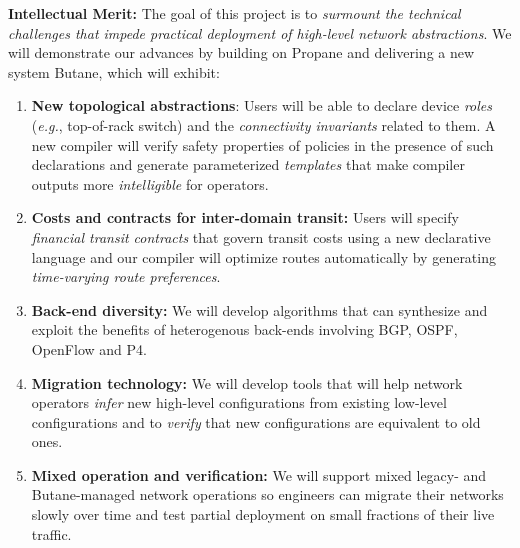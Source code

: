 \documentclass[12pt]{article}
\makeatletter
\newcommand{\Propane}{{\sc Propane}\@\xspace}
\newcommand{\Name}{{\sc Butane}\@\xspace}
\makeatother
\begin{document}
\noindent
\textbf{Intellectual Merit:} 
The goal of this project is to 
{\em surmount the technical challenges that impede practical 
deployment of high-level network abstractions}.  We will demonstrate
our advances by building on \Propane and delivering a new system \Name, which
will exhibit:  
\begin{enumerate}
\item {\bf New topological abstractions}:  Users will be able to declare device 
\emph{roles} (\emph{e.g.}, top-of-rack switch)
and the \emph{connectivity invariants} related to them.  A new compiler
will verify safety properties of policies in the presence of such 
declarations and generate parameterized \emph{templates}
that make compiler outputs more \emph{intelligible} for operators.  
\item {\bf Costs and contracts for inter-domain transit:}
Users will specify 
\emph{financial transit contracts} that govern transit
costs using a new declarative language and our compiler will
optimize routes automatically by generating  \emph{time-varying route preferences}.
\item {\bf Back-end diversity:}  We will develop algorithms that
can synthesize and exploit the benefits of heterogenous back-ends 
involving BGP, OSPF, OpenFlow and P4.
\item {\bf Migration technology:} We will develop
tools that will help network operators \emph{infer} 
new high-level configurations from existing low-level configurations
and to \emph{verify} that new configurations are equivalent to old ones.
\item {\bf Mixed operation and verification:} We will support mixed
legacy- and \Name-managed network operations so engineers can
migrate their networks slowly over time and test partial deployment on
small fractions of their live traffic.
\end{enumerate}
\end{document}
